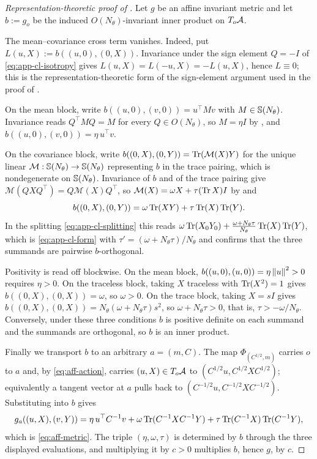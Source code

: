 \begin{proof}[Representation-theoretic proof of ]
    Let $g$ be an affine invariant metric and let $b := g_o$ be the induced $O(N_\theta)$-invariant inner product on $T_o\mathcal{A}$.

    The mean--covariance cross term vanishes. Indeed, put $L(u, X) := b((u,0),(0,X))$. Invariance under the sign element $Q = -I$ of \eqref{eq:app-cl-isotropy} gives $L(u, X) = L(-u, X) = -L(u, X)$, hence $L \equiv 0$; this is the representation-theoretic form of the sign-element argument used in the proof of .

    On the mean block, write $b((u,0),(v,0)) = u^\top M v$ with $M \in \mathbb{S}(N_\theta)$. Invariance reads $Q^\top M Q = M$ for every $Q \in O(N_\theta)$, so $M = \eta I$ by , and $b((u,0),(v,0)) = \eta \, u^\top v$.

    On the covariance block, write $b((0,X),(0,Y)) = \operatorname{Tr}(\mathcal{M}(X) Y)$ for the unique linear $\mathcal{M} : \mathbb{S}(N_\theta) \to \mathbb{S}(N_\theta)$ representing $b$ in the trace pairing, which is nondegenerate on $\mathbb{S}(N_\theta)$. Invariance of $b$ and of the trace pairing give $\mathcal{M}(QXQ^\top) = Q \mathcal{M}(X) Q^\top$, so $\mathcal{M}(X) = \omega X + \tau (\operatorname{Tr} X) I$ by  and
    \begin{equation}\label{eq:app-cl-cov}
        b((0,X),(0,Y)) = \omega \operatorname{Tr}(XY) + \tau \operatorname{Tr}(X) \operatorname{Tr}(Y).
    \end{equation}
    In the splitting \eqref{eq:app-cl-splitting} this reads $\omega \operatorname{Tr}(X_0 Y_0) + \frac{\omega + N_\theta\tau}{N_\theta} \operatorname{Tr}(X)\operatorname{Tr}(Y)$, which is \eqref{eq:app-cl-form} with $\tau' = (\omega + N_\theta \tau)/N_\theta$ and confirms that the three summands are pairwise $b$-orthogonal.

    Positivity is read off blockwise. On the mean block, $b((u,0),(u,0)) = \eta \left\lVert u\right\rVert^2 > 0$ requires $\eta > 0$. On the traceless block, taking $X$ traceless with $\operatorname{Tr}(X^2) = 1$ gives $b((0,X),(0,X)) = \omega$, so $\omega > 0$. On the trace block, taking $X = sI$ gives $b((0,X),(0,X)) = N_\theta(\omega + N_\theta\tau) s^2$, so $\omega + N_\theta \tau > 0$, that is, $\tau > -\omega/N_\theta$. Conversely, under these three conditions $b$ is positive definite on each summand and the summands are orthogonal, so $b$ is an inner product.

    Finally we transport $b$ to an arbitrary $a = (m, C)$. The map $\Phi_{(C^{1/2}, m)}$ carries $o$ to $a$ and, by \eqref{eq:aff-action}, carries $(u, X) \in T_o\mathcal{A}$ to $(C^{1/2} u, C^{1/2} X C^{1/2})$; equivalently a tangent vector at $a$ pulls back to $(C^{-1/2}u, C^{-1/2} X C^{-1/2})$. Substituting into $b$ gives
    \begin{equation*}
        g_a((u,X),(v,Y)) = \eta \, u^\top C^{-1} v + \omega \operatorname{Tr}(C^{-1} X C^{-1} Y) + \tau \operatorname{Tr}(C^{-1}X)\operatorname{Tr}(C^{-1}Y),
    \end{equation*}
    which is \eqref{eq:aff-metric}. The triple $(\eta, \omega, \tau)$ is determined by $b$ through the three displayed evaluations, and multiplying it by $c > 0$ multiplies $b$, hence $g$, by $c$.
\end{proof}

